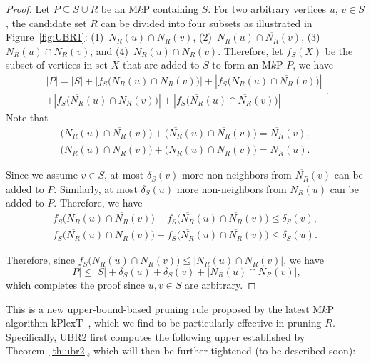 \documentclass[sigconf, nonacm]{acmart}
\begin{document}
\begin{proof} Let $P\subseteq S\cup R$ be an M$k$P containing $S$. For two arbitrary vertices $u$, $v\in S$, the candidate set $R$ can be divided into four subsets as illustrated in Figure~\ref{fig:UBR1}: (1)~$N_{R}(u)\cap N_{R}(v)$, (2)~$N_{R}(u)\cap \overline{N_{R}}(v)$, (3)~$\overline{N_{R}}(u)\cap N_{R}(v)$, and (4)~$\overline{N_{R}}(u)\cap \overline{N_{R}}(v)$. Therefore, let $f_S(X)$ be the subset of vertices in set $X$ that are added to $S$ to form an M$k$P $P$, we have
\begin{equation*}
    \begin{split}
    |P|= |S|+|f_S\big(N_{R}(u)\cap N_{R}(v)\big)|+|f_S\big(N_{R}(u)\cap \overline{N_{R}}(v)\big)|\\
    + |f_S\big(\overline{N_{R}}(u)\cap N_{R}(v)\big)|+|f_S\big(\overline{N_{R}}(u)\cap \overline{N_{R}}(v)\big)|
    \end{split}. 
\end{equation*}
Note that
\begin{gather*}
    \big(N_{R}(u)\cap \overline{N_{R}}(v)\big)+\big(\overline{N_{R}}(u)\cap \overline{N_{R}}(v)\big)=\overline{N_{R}}(v),\\
    \big(\overline{N_{R}}(u)\cap N_{R}(v)\big)+\big(\overline{N_{R}}(u)\cap \overline{N_{R}}(v)\big)=\overline{N_{R}}(u).
\end{gather*}

Since we assume $v\in S$, at most $\delta_S(v)$ more non-neighbors from $\overline{N_{R}}(v)$ can be added to $P$. 
Similarly, at most $\delta_S(u)$ more non-neighbors from $\overline{N_{R}}(u)$ can be added to $P$. Therefore, we have
\begin{gather*}
    f_S\big(N_{R}(u)\cap \overline{N_{R}}(v)\big)+f_S\big(\overline{N_{R}}(u)\cap \overline{N_{R}}(v)\big)\leq\delta_S(v),\\
    f_S\big(\overline{N_{R}}(u)\cap N_{R}(v)\big)+f_S\big(\overline{N_{R}}(u)\cap \overline{N_{R}}(v)\big)\leq\delta_S(u).
\end{gather*}

Therefore, since $f_S\big(N_{R}(u)\cap N_{R}(v)\big)\leq |N_{R}(u)\cap N_{R}(v)|$, we have 
\begin{equation*}\label{eq:ub_2sup}
|P|\le |S|+\delta_S(u)+\delta_S(v)+|N_{R}(u)\cap N_{R}(v)|,
\end{equation*}
which completes the proof since $u, v\in S$ are arbitrary. 
\end{proof}

 This is a new upper-bound-based pruning rule proposed by the latest M$k$P algorithm kPlexT~\cite{kPlexT}, which we find to be particularly effective in pruning $R$. Specifically, UBR2 first computes the following upper established by Theorem~\ref{th:ubr2}, which will then be further tightened (to be described soon):
\end{document}

